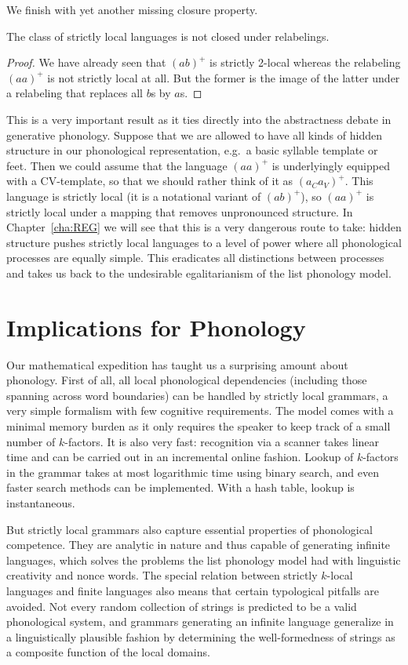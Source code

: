 We finish with yet another missing closure property.
%
\begin{lemma}
    The class of strictly local languages is not closed under relabelings.
\end{lemma}
%
%
\begin{proof}
    We have already seen that $(ab)^+$ is strictly 2-local whereas the relabeling $(aa)^+$ is not strictly local at all.
    But the former is the image of the latter under a relabeling that replaces all $b$s by $a$s.
\end{proof}
%
This is a very important result as it ties directly into the abstractness debate in generative phonology.
Suppose that we are allowed to have all kinds of hidden structure in our phonological representation, e.g.\ a basic syllable template or feet.
Then we could assume that the language $(aa)^+$ is underlyingly equipped with a CV-template, so that we should rather think of it as $(a_C a_V)^+$.
This language is strictly local (it is a notational variant of $(ab)^+$), so $(aa)^+$ is strictly local under a mapping that removes unpronounced structure.
In Chapter~\ref{cha:REG} we will see that this is a very dangerous route to take: hidden structure pushes strictly local languages to a level of power where all phonological processes are equally simple.
This eradicates all distinctions between processes and takes us back to the undesirable egalitarianism of the list phonology model.

\section{Implications for Phonology}
Our mathematical expedition has taught us a surprising amount about phonology.
First of all, all local phonological dependencies (including those spanning across word boundaries) can be handled by strictly local grammars, a very simple formalism with few cognitive requirements.
The model comes with a minimal memory burden as it only requires the speaker to keep track of a small number of $k$-factors.
It is also very fast: recognition via a scanner takes linear time and can be carried out in an incremental online fashion.
Lookup of $k$-factors in the grammar takes at most logarithmic time using binary search, and even faster search methods can be implemented.
With a hash table, lookup is instantaneous.

But strictly local grammars also capture essential properties of phonological competence.
They are analytic in nature and thus capable of generating infinite languages, which solves the problems the list phonology model had with linguistic creativity and nonce words.
The special relation between strictly $k$-local languages and finite languages also means that certain typological pitfalls are avoided.
Not every random collection of strings is predicted to be a valid phonological system, and grammars generating an infinite language generalize in a linguistically plausible fashion by determining the well-formedness of strings as a composite function of the local domains.

